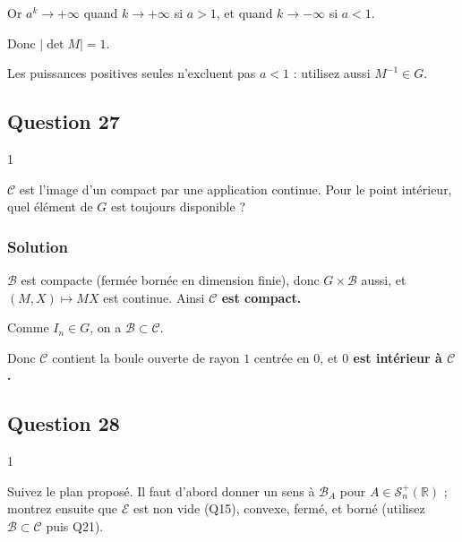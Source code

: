 \documentclass[11pt,a4paper]{article}
\begin{document}
Or \(a^k\to+\infty\) quand \(k\to+\infty\) si \(a>1\), et quand \(k\to-\infty\) si \(a<1\).

Donc \(\boxed{|\det M|=1}\).

\begin{piege}

Les puissances positives seules n'excluent pas \(a<1\) : utilisez aussi \(M^{-1}\in G\).

\end{piege}

\hypertarget{question-27}{%
\subsection{Question 27}\label{question-27}}

\begin{indication}{1}

\(\mathcal{C}\) est l'image d'un compact par une application continue. Pour le point intérieur, quel élément de \(G\) est toujours disponible ?

\end{indication}

\hypertarget{solution-26}{%
\subsubsection{Solution}\label{solution-26}}

\(\mathcal{B}\) est compacte (fermée bornée en dimension finie), donc \(G\times\mathcal{B}\) aussi, et \((M,X)\mapsto MX\) est continue. Ainsi \textbf{\(\mathcal{C}\) est compact.}

Comme \(I_n\in G\), on a \(\mathcal{B}\subset\mathcal{C}\).

Donc \(\mathcal{C}\) contient la boule ouverte de rayon \(1\) centrée en \(0\), et \textbf{\(0\) est intérieur à \(\mathcal{C}\).}

\hypertarget{question-28}{%
\subsection{Question 28}\label{question-28}}

\begin{indication}{1}

Suivez le plan proposé. Il faut d'abord donner un sens à \({\mathcal{B}}_A\) pour \(A\in{\mathcal{S}}_n^+(\mathbb{R})\) ; montrez ensuite que \(\mathcal{E}\) est non vide (Q15), convexe, fermé, et borné (utilisez \(\mathcal{B}\subset\mathcal{C}\) puis Q21).

\end{indication}
\end{document}
